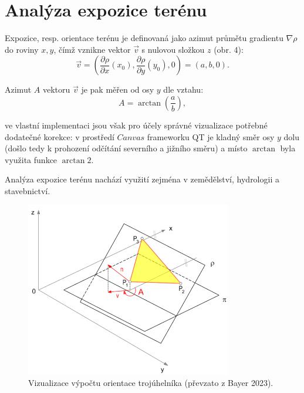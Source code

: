 \section*{Analýza expozice terénu}
\par Expozice, resp. orientace terénu je definovaná jako azimut průmětu gradientu $\nabla \rho$ do roviny $x, y$, čímž vznikne vektor $\Vec{v}$ s nulovou složkou $z$ (obr. 4):\vspace{10pt}
\begin{equation*}
    \Vec{v} = \left(\frac{\partial \rho}{\partial x}(x_0), \frac{\partial \rho}{\partial y}(y_0), 0\right) = (a, b, 0).
\end{equation*}
\par Azimut $A$ vektoru $\Vec{v}$ je pak měřen od osy $y$ dle vztahu:
\begin{equation*}
    A = \arctan{\left(\frac{a}{b}\right)},
\end{equation*}
\par ve vlastní implementaci jsou však pro účely správné vizualizace potřebné dodatečné korekce: v prostředí $Canvas$ frameworku QT je kladný směr osy $y$ dolu (došlo tedy k prohození odčítání severního a jižního směru) a místo $\arctan$ byla využita funkce $\arctan2$.
\par Analýza expozice terénu nachází využití zejména v zemědělství, hydrologii a stavebnictví.
\begin{figure}[H]
\centering
\includegraphics[width=9cm]{images/aspect.png} 
    \caption{Vizualizace výpočtu orientace trojúhelníka (převzato z Bayer 2023).}
\end{figure}
